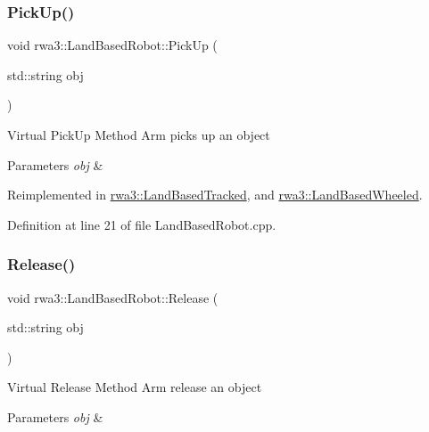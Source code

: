 \mbox{\label{classrwa3_1_1_land_based_robot_adf0c76440e2f9d2ea5cbe7193cddfe2b}} 
\subsubsection{\texorpdfstring{Pick\+Up()}{PickUp()}}
{\footnotesize\ttfamily void rwa3\+::\+Land\+Based\+Robot\+::\+Pick\+Up (\begin{DoxyParamCaption}\item[{std\+::string}]{obj }\end{DoxyParamCaption})\hspace{0.3cm}{\ttfamily [virtual]}}

Virtual Pick\+Up Method Arm picks up an object 
\begin{DoxyParams}{Parameters}
{\em obj} & \\
\hline
\end{DoxyParams}


Reimplemented in \hyperlink{classrwa3_1_1_land_based_tracked_af1e65be827430cd9281e982409ebedcb}{rwa3\+::\+Land\+Based\+Tracked}, and \hyperlink{classrwa3_1_1_land_based_wheeled_aa82a9a72c4452ba203edc4c9ef0ad6c6}{rwa3\+::\+Land\+Based\+Wheeled}.



Definition at line 21 of file Land\+Based\+Robot.\+cpp.

\mbox{\label{classrwa3_1_1_land_based_robot_a5cae9fc0c1365b984e09b807f79089e0}} 
\subsubsection{\texorpdfstring{Release()}{Release()}}
{\footnotesize\ttfamily void rwa3\+::\+Land\+Based\+Robot\+::\+Release (\begin{DoxyParamCaption}\item[{std\+::string}]{obj }\end{DoxyParamCaption})\hspace{0.3cm}{\ttfamily [virtual]}}

Virtual Release Method Arm release an object 
\begin{DoxyParams}{Parameters}
{\em obj} & \\
\hline
\end{DoxyParams}


